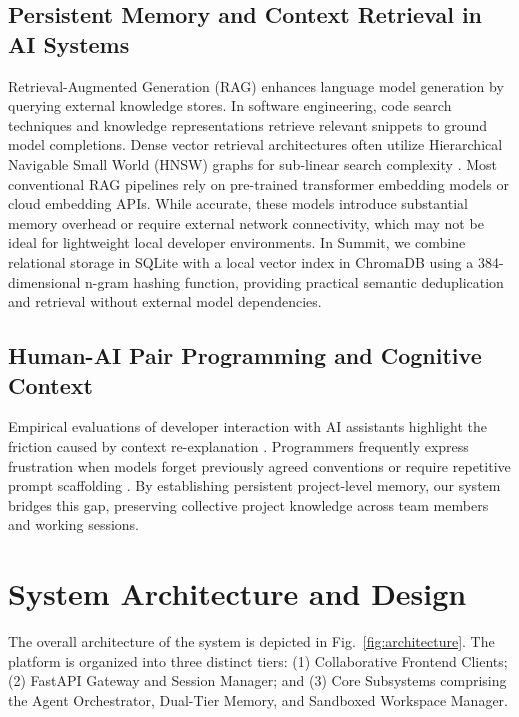 \documentclass[conference]{IEEEtran}
\begin{document}
\subsection{Persistent Memory and Context Retrieval in AI Systems}
Retrieval-Augmented Generation (RAG) \cite{lewis2020retrieval} enhances language model generation by querying external knowledge stores. In software engineering, code search techniques \cite{gu2018deep} and knowledge representations \cite{gao2022constructing} retrieve relevant snippets to ground model completions. Dense vector retrieval architectures often utilize Hierarchical Navigable Small World (HNSW) graphs \cite{malkov2020efficient} for sub-linear search complexity \cite{johnson2021billion}. Most conventional RAG pipelines rely on pre-trained transformer embedding models \cite{vaswani2017attention} or cloud embedding APIs. While accurate, these models introduce substantial memory overhead or require external network connectivity, which may not be ideal for lightweight local developer environments. In Summit, we combine relational storage in SQLite with a local vector index in ChromaDB using a 384-dimensional n-gram hashing function, providing practical semantic deduplication and retrieval without external model dependencies.

\subsection{Human-AI Pair Programming and Cognitive Context}
Empirical evaluations of developer interaction with AI assistants highlight the friction caused by context re-explanation \cite{vaithilingam2022expectation, sarker2023towards}. Programmers frequently express frustration when models forget previously agreed conventions or require repetitive prompt scaffolding \cite{ross2023programmer}. By establishing persistent project-level memory, our system bridges this gap, preserving collective project knowledge across team members and working sessions.

\section{System Architecture and Design}

The overall architecture of the system is depicted in Fig.~\ref{fig:architecture}. The platform is organized into three distinct tiers: (1) Collaborative Frontend Clients; (2) FastAPI Gateway and Session Manager; and (3) Core Subsystems comprising the Agent Orchestrator, Dual-Tier Memory, and Sandboxed Workspace Manager.
\end{document}
